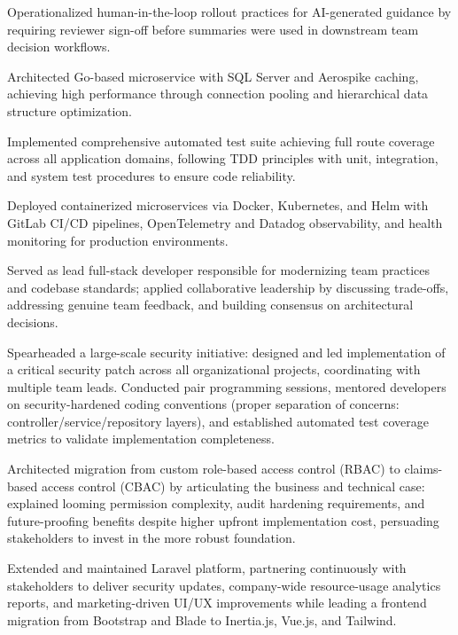 \documentclass{../styles/cv}
\begin{document}
    \item Operationalized human-in-the-loop rollout practices for AI-generated guidance by requiring reviewer sign-off before summaries were used in downstream team decision workflows.
    \item Architected Go-based microservice with SQL Server and Aerospike caching, achieving high performance through connection pooling and hierarchical data structure optimization.
    \item Implemented comprehensive automated test suite achieving full route coverage across all application domains, following TDD principles with unit, integration, and system test procedures to ensure code reliability.
    \item Deployed containerized microservices via Docker, Kubernetes, and Helm with GitLab CI/CD pipelines, OpenTelemetry and Datadog observability, and health monitoring for production environments.
    \resumenestedlistend
    \resumenestedlistbegin
    \item Served as lead full-stack developer responsible for modernizing team practices and codebase standards; applied collaborative leadership by discussing trade-offs, addressing genuine team feedback, and building consensus on architectural decisions.
    \item Spearheaded a large-scale security initiative: designed and led implementation of a critical security patch across all organizational projects, coordinating with multiple team leads. Conducted pair programming sessions, mentored developers on security-hardened coding conventions (proper separation of concerns: controller/service/repository layers), and established automated test coverage metrics to validate implementation completeness.
    \item Architected migration from custom role-based access control (RBAC) to claims-based access control (CBAC) by articulating the business and technical case: explained looming permission complexity, audit hardening requirements, and future-proofing benefits despite higher upfront implementation cost, persuading stakeholders to invest in the more robust foundation.
    \item Extended and maintained Laravel platform, partnering continuously with stakeholders to deliver security updates, company-wide resource-usage analytics reports, and marketing-driven UI/UX improvements while leading a frontend migration from Bootstrap and Blade to Inertia.js, Vue.js, and Tailwind.
\end{document}
